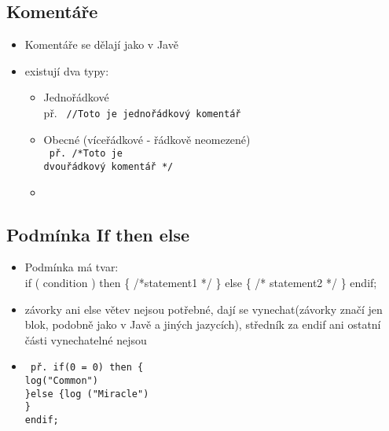 \documentclass[11pt,a4paper]{article}   	%
\begin{document}
\subsection{Komentáře}
\begin{itemize}
  \item Komentáře se dělají jako v Javě
  \item existují dva typy:
  		\begin{itemize}
  		  	\item Jednořádkové\\  					%
				př. \texttt {						%
						//Toto je jednořádkový komentář
					}
  		  	\item Obecné (víceřádkové - řádkově neomezené)\\
				\texttt{ 
					př. /*Toto je\\
					dvouřádkový komentář */
				}
  		  	\item 
  		  \end{itemize}
\end{itemize}

\subsection{Podmínka If then else}
\begin{itemize}
   \item 	Podmínka má tvar: \\
   		 	if ( condition ) then \{ /*statement1 */ \} else \{ /* statement2 */ \}
   		 	endif;
   \item 	závorky ani else větev nejsou potřebné, dají se vynechat(závorky značí
   			jen blok, podobně jako v Javě a jiných jazycích), středník za endif ani
   			ostatní části vynechatelné nejsou
   
   \item 	\texttt {
   				př. if(0 = 0) then \{ \\ log("Common") \\ 
   				\}else \{log ("Miracle") \\ \}
   				\\endif; 
   			}
\end{itemize} 
\end{document}
